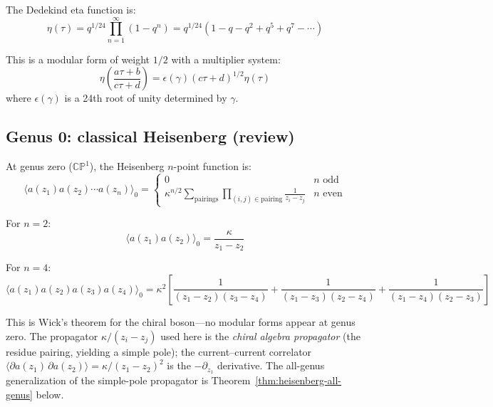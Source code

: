 \begin{definition}\label{def:eta-function}
The Dedekind eta function is:
\begin{equation}
\eta(\tau) = q^{1/24} \prod_{n=1}^{\infty} (1 - q^n) 
= q^{1/24}(1 - q - q^2 + q^5 + q^7 - \cdots)
\end{equation}

This is a modular form of weight $1/2$ with a multiplier system:
\begin{equation}
\eta\left(\frac{a\tau+b}{c\tau+d}\right) = \epsilon(\gamma) (c\tau + d)^{1/2} \eta(\tau)
\end{equation}
where $\epsilon(\gamma)$ is a 24th root of unity determined by $\gamma$.
\end{definition}

\subsection{Genus 0: classical Heisenberg (review)}
\label{subsec:heisenberg-genus-zero}

\begin{theorem}\label{thm:heisenberg-genus-zero}
At genus zero ($\mathbb{CP}^1$), the Heisenberg $n$-point function is:
\begin{equation}
\langle a(z_1) a(z_2) \cdots a(z_n) \rangle_0 = 
\begin{cases}
0 & n \text{ odd} \\
\kappa^{n/2} \sum_{\text{pairings}} \prod_{(i,j) \in \text{pairing}} \frac{1}{z_i - z_j} 
& n \text{ even}
\end{cases}
\end{equation}

For $n=2$:
\[\langle a(z_1) a(z_2) \rangle_0 = \frac{\kappa}{z_1 - z_2}\]

For $n=4$:
\[\langle a(z_1) a(z_2) a(z_3) a(z_4) \rangle_0 = \kappa^2 \left[
\frac{1}{(z_1-z_2)(z_3-z_4)} + \frac{1}{(z_1-z_3)(z_2-z_4)} + 
\frac{1}{(z_1-z_4)(z_2-z_3)}
\right]\]

This is Wick's theorem for the chiral boson---no modular forms appear at genus zero.
The propagator $\kappa/(z_i - z_j)$ used here is the \emph{chiral algebra propagator}
(the residue pairing, yielding a simple pole); the current--current correlator
$\langle \partial a(z_1)\, \partial a(z_2)\rangle = \kappa/(z_1-z_2)^2$ is
the $-\partial_{z_1}$ derivative.  The all-genus generalization of the
simple-pole propagator is Theorem~\ref{thm:heisenberg-all-genus} below.
\end{theorem}

